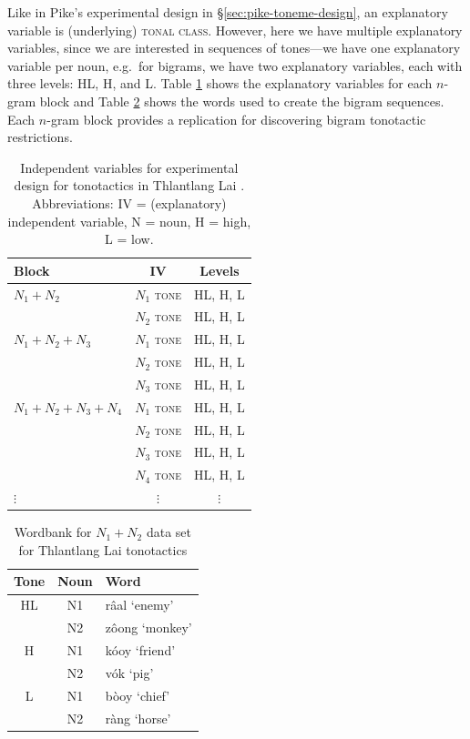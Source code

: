 \documentclass[12pt]{article}
\begin{document}
Like in Pike's experimental design in \S\ref{sec:pike-toneme-design}, an explanatory variable is
(underlying) \textsc{tonal class}. However, here we have multiple explanatory
variables, since we are interested in sequences of tones---we
have one explanatory variable per noun, e.g.\ for bigrams, we have two
explanatory variables, each with three levels: HL, H, and L. Table
\ref{tab:hyman-2007-exp-design} shows the explanatory variables for
each $n$-gram block and Table \ref{tab:hyman-2007-wordbank} shows the
words used to create the bigram sequences. Each $n$-gram block
provides a replication for discovering bigram tonotactic restrictions.
 
\begin{table}[!h]
  \centering
  \begin{tabular}{l | c c}
    Block & IV  & Levels\\\hline
    $N_1+N_2$ & $N_1$ \textsc{tone} & HL, H, L\\
     & $N_2$ \textsc{tone} & HL, H, L\\\hline
    $N_1+N_2+N_3$ & $N_1$ \textsc{tone} & HL, H, L\\
     & $N_2$ \textsc{tone} & HL, H, L\\
     & $N_3$ \textsc{tone} & HL, H, L\\\hline
    $N_1+N_2+N_3+N_4$ & $N_1$ \textsc{tone} & HL, H, L\\
     & $N_2$ \textsc{tone} & HL, H, L\\
     & $N_3$ \textsc{tone} & HL, H, L\\
     & $N_4$ \textsc{tone} & HL, H, L\\\hline
     $\vdots$&$\vdots$ &$\vdots$ \\
  \end{tabular}
  \caption{Independent variables for experimental design for tonotactics in Thlantlang Lai
    \citep[(18)]{Hyman:2007}. Abbreviations: IV = (explanatory)
    independent variable, N = noun, H = high, L = low.}
  \label{tab:hyman-2007-exp-design}
\end{table}

\begin{table}[!h]
  \centering
  \begin{tabular}{c | c l}
    Tone& Noun & Word \\\hline
    HL & N1 & r\^{a}al `enemy'\\
     & N2 & z\^{o}ong `monkey'\\\hline
    H & N1 & k\'ooy `friend'\\
     & N2 & v\'ok `pig'\\\hline
    L & N1 & b\`ooy `chief'\\
     & N2 & r\`ang `horse'\\\hline
  \end{tabular}
  \caption{Wordbank for $N_1+N_2$ data set for Thlantlang Lai
    tonotactics \citep[(19)]{Hyman:2007}}
  \label{tab:hyman-2007-wordbank}
\end{table}
\end{document}
